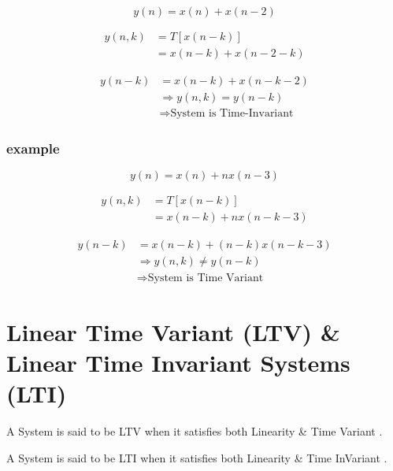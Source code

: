 \documentclass[12pt]{article}
\begin{document}
$$
y(n) = x(n) + x(n-2)
$$





\begin{align*}
y(n,k) &= T[x(n-k)] \\ 
&= x(n-k) + x(n-2-k)
\end{align*}




\begin{align*}
y(n-k) &= x(n-k) + x(n-k-2) \\ 
&\Rightarrow y(n,k) = y(n-k) \\
&\Rightarrow \text{System is Time-Invariant}
\end{align*}







\subsubsection{example}



$$
y(n) = x(n) + nx(n-3)
$$




\begin{align*}
y(n,k) &= T[x(n-k)] \\ 
&= x(n-k) + n x(n-k-3)
\end{align*}




\begin{align*}
y(n-k) &= x(n-k) +  (n-k) x(n-k-3) \\ 
&\Rightarrow y(n,k) \neq y(n-k) \\
&\Rightarrow \text{System is Time Variant}
\end{align*}







\section{Linear Time Variant (LTV) \& Linear Time Invariant Systems (LTI)}



A System is said to be LTV when it satisfies both Linearity \& Time Variant .

A System is said to be LTI when it satisfies both Linearity \& Time InVariant .
\end{document}
